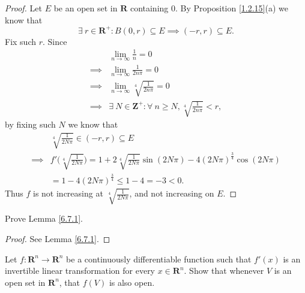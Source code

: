 \begin{proof}
    Let \(E\) be an open set in \(\mathbf{R}\) containing \(0\).
    By Proposition \ref{1.2.15}(a) we know that
    \[
        \exists\ r \in \mathbf{R}^+ : B(0, r) \subseteq E \implies (-r, r) \subseteq E.
    \]
    Fix such \(r\).
    Since
    \begin{align*}
                 & \lim_{n \to \infty} \frac{1}{n} = 0                                               \\
        \implies & \lim_{n \to \infty} \frac{1}{2 n \pi} = 0                                         \\
        \implies & \lim_{n \to \infty} \sqrt[4]{\frac{1}{2 n \pi}} = 0                               \\
        \implies & \exists\ N \in \mathbf{Z}^+ : \forall\ n \geq N, \sqrt[4]{\frac{1}{2 n \pi}} < r,
    \end{align*}
    by fixing such \(N\) we know that
    \begin{align*}
                 & \sqrt[4]{\frac{1}{2 N \pi}} \in (-r, r) \subseteq E                                                                                   \\
        \implies & f'\bigg(\sqrt[4]{\frac{1}{2 N \pi}}\bigg) = 1 + 2 \sqrt[4]{\frac{1}{2 N \pi}} \sin(2 N \pi) - 4 (2 N \pi)^{\frac{3}{4}} \cos(2 N \pi) \\
                 & = 1 - 4 (2 N \pi)^{\frac{3}{4}} \leq 1 - 4 = -3 < 0.
    \end{align*}
    Thus \(f\) is not increasing at \(\sqrt[4]{\frac{1}{2 N \pi}}\), and not increasing on \(E\).
\end{proof}

\begin{exercise}\label{ex 6.7.2}
    Prove Lemma \ref{6.7.1}.
\end{exercise}

\begin{proof}
    See Lemma \ref{6.7.1}.
\end{proof}

\begin{exercise}\label{ex 6.7.3}
    Let \(f : \mathbf{R}^n \to \mathbf{R}^n\) be a continuously differentiable function such that \(f'(x)\) is an invertible linear transformation for every \(x \in \mathbf{R}^n\).
    Show that whenever \(V\) is an open set in \(\mathbf{R}^n\), that \(f(V)\) is also open.
\end{exercise}


